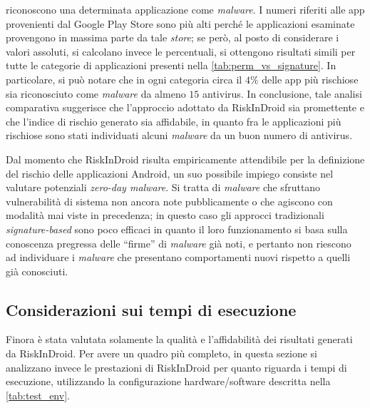 \documentclass[12pt,a4paper,oneside]{article}
\begin{document}
riconoscono una determinata applicazione come \textit{malware}. I numeri riferiti alle app provenienti dal Google Play Store sono più alti perché le applicazioni esaminate provengono in massima parte da tale \textit{store}; se però, al posto di considerare i valori assoluti, si calcolano invece le percentuali, si ottengono risultati simili per tutte le categorie di applicazioni presenti nella \cref{tab:perm_vs_signature}. In particolare, si può notare che in ogni categoria circa il $4\%$ delle app più rischiose sia riconosciuto come \textit{malware} da almeno $15$ antivirus. In conclusione, tale analisi comparativa suggerisce che l'approccio adottato da RiskInDroid sia promettente e che l'indice di rischio generato sia affidabile, in quanto fra le applicazioni più rischiose sono stati individuati alcuni \textit{malware} da un buon numero di antivirus.

Dal momento che RiskInDroid risulta empiricamente attendibile per la definizione del rischio delle applicazioni Android, un suo possibile impiego consiste nel valutare potenziali \textit{zero-day malware}. Si tratta di \textit{malware} che sfruttano vulnerabilità di sistema non ancora note pubblicamente o che agiscono con modalità mai viste in precedenza; in questo caso gli approcci tradizionali \textit{signature-based} sono poco efficaci in quanto il loro funzionamento si basa sulla conoscenza pregressa delle ``firme'' di \textit{malware} già noti, e pertanto non riescono ad individuare i \textit{malware} che presentano comportamenti nuovi rispetto a quelli già conosciuti.



\subsection{Considerazioni sui tempi di esecuzione}\label{sec:performance}

Finora è stata valutata solamente la qualità e l'affidabilità dei risultati generati da RiskInDroid. Per avere un quadro più completo, in questa sezione si analizzano invece le prestazioni di RiskInDroid per quanto riguarda i tempi di esecuzione, utilizzando la configurazione hardware/software descritta nella \cref{tab:test_env}.
\end{document}

